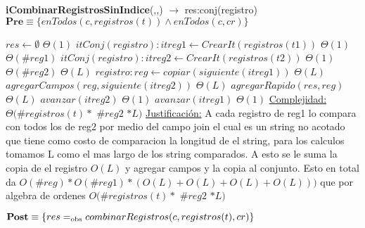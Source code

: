 \begin{algorithm}[H]{\textbf{iCombinarRegistrosSinIndice}(,,) $\to$ res:conj(registro)}
	{\\ $\textbf{Pre} \equiv \{enTodos(c,registros(t)) \land enTodos(c,cr)\}$}
	\begin{algorithmic}[1]
		\State $res \gets \emptyset$ \Comment $\Theta(1)$
		\State $itConj(registro): itreg1 \gets CrearIt(registros(t1))$ \Comment	$\Theta(1)$
		 \Comment $\Theta(\#reg1)$
			\State $itConj(registro): itreg2 \gets CrearIt(registros(t2))$ \Comment	$\Theta(1)$
			 \Comment $\Theta(\#reg2)$
				 \Comment $\Theta(L)$
					\State $registro: reg \gets copiar(siguiente(itreg1))$ \Comment $\Theta(L)$
					\State $agregarCampos(reg,siguiente(itreg2))$	\Comment $\Theta(L)$
					\State $agregarRapido(res,reg)$	\Comment $\Theta(L)$
				\EndIf
				\State $avanzar(itreg2)$ \Comment $\Theta(1)$
			\EndWhile
			\State $avanzar(itreg1)$	\Comment $\Theta(1)$
		\EndWhile
		\medskip
		\Statex \underline{Complejidad:} $\Theta(\#registros(t) *$  $\#reg2$ $* L)$
		\Statex \underline{Justificación:} A cada registro de reg1 lo compara con todos los de reg2 por medio del campo join el cual es un string no acotado que tiene como costo de comparacion la longitud de el string, para los calculos tomamos L como el mas largo de los string comparados. A esto se le suma la copia de el registro $O(L)$ y agregar campos y la copia al conjunto. Esto en total da $O(\#reg) * O(\#reg1) * (O(L) + O(L) + O(L) + O(L)))$ que por algebra de ordenes $O(\#registros(t) *$ $\#reg2$ $* L)$
	\end{algorithmic}
	{$\textbf{Post} \equiv \{res =_{\mathrm{obs}} combinarRegistros(c,registros(t),cr)\}$}
\end{algorithm}

